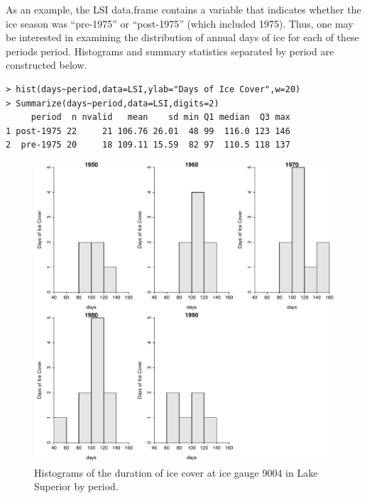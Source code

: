\documentclass[10pt,openany]{book}\usepackage[]{graphicx}\usepackage[]{color}
\makeatletter
\newenvironment{kframe}{%
 \def\at@end@of@kframe{}%
 \ifinner\ifhmode%
  \def\at@end@of@kframe{\end{minipage}}%
  \begin{minipage}{\columnwidth}%
 \fi\fi%
 \def\FrameCommand##1{\hskip\@totalleftmargin \hskip-\fboxsep
 \colorbox{shadecolor}{##1}\hskip-\fboxsep
     \hskip-\linewidth \hskip-\@totalleftmargin \hskip\columnwidth}%
 \MakeFramed {\advance\hsize-\width
   \@totalleftmargin\z@ \linewidth\hsize
   \@setminipage}}%
 {\par\unskip\endMakeFramed%
 \at@end@of@kframe}
\newenvironment{knitrout}{}{} %
\makeatother
\begin{document}
As an example, the LSI data.frame contains a  variable that indicates whether the ice season was ``pre-1975'' or ``post-1975'' (which included 1975). Thus, one may be interested in examining the distribution of annual days of ice for each of these periods period. Histograms  and summary statistics separated by period are constructed below.
\begin{knitrout}
\color{fgcolor}\begin{kframe}
\begin{verbatim}
> hist(days~period,data=LSI,ylab="Days of Ice Cover",w=20)
> Summarize(days~period,data=LSI,digits=2)
     period  n nvalid   mean    sd min Q1 median  Q3 max
1 post-1975 22     21 106.76 26.01  48 99  116.0 123 146
2  pre-1975 20     18 109.11 15.59  82 97  110.5 118 137
\end{verbatim}
\end{kframe}\begin{figure}[hbtp]

{\centering \includegraphics[width=.8\linewidth]{Figs/mhist1-1} 

}

\caption[Histograms of the duration of ice cover at ice gauge 9004 in Lake Superior by period]{Histograms of the duration of ice cover at ice gauge 9004 in Lake Superior by period.}\label{fig:mhist1}
\end{figure}


\end{knitrout}
\end{document}
